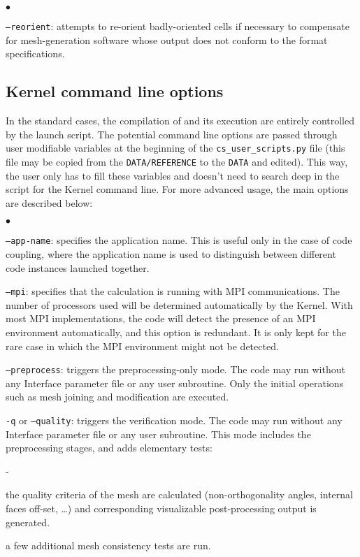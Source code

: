 {{{{\begin{list}{$\bullet$}{}
\item \texttt{--reorient}: attempts to re-orient badly-oriented cells
if necessary to compensate for mesh-generation software
whose output does not conform to the format specifications.

\end{list}

\subsection{Kernel command line options}
\label{sec:prg_optappelnoy}%
In the standard cases, the compilation of \CS and its execution are entirely
controlled by the launch script. The potential command line options are passed
through user modifiable variables at the beginning of the \texttt{cs\_user\_scripts.py} file
(this file may be copied from the \texttt{DATA/REFERENCE} to the \texttt{DATA} and edited).
This way, the user only has to fill these variables and doesn't need
to search deep in the script for the Kernel command line. For more advanced
usage, the main options are described below:

\begin{list}{$\bullet$}{}
\item \texttt{--app-name}: specifies the application name. This is
useful only in the case of code coupling, where the application name
is used to distinguish between different code instances launched together.

\item \texttt{--mpi}: specifies that the calculation is running
with MPI communications. The number of processors used will be determined
automatically by the Kernel. With most MPI implementations, the
code will detect the presence of an MPI environment automatically, and
this option is redundant. It is only kept for the rare case in which the
MPI environment might not be detected.

\item \texttt{--preprocess}: triggers the preprocessing-only mode.
The code may run without any Interface parameter file or any user subroutine.
Only the initial operations such as mesh joining and modification are
executed.

\item \texttt{-q} or \texttt{--quality}: triggers the verification mode.
The code may run without any Interface parameter file or any user subroutine.
This mode includes the preprocessing stages, and adds elementary tests:\\
\begin{list}{-}{}
\item the quality criteria of the mesh are calculated (non-orthogonality angles,
internal faces off-set, \ldots) and corresponding
visualizable post-processing output is generated.\\
\item a few additional mesh consistency tests are run.\\
\end{list}


\end{list}}}}}
